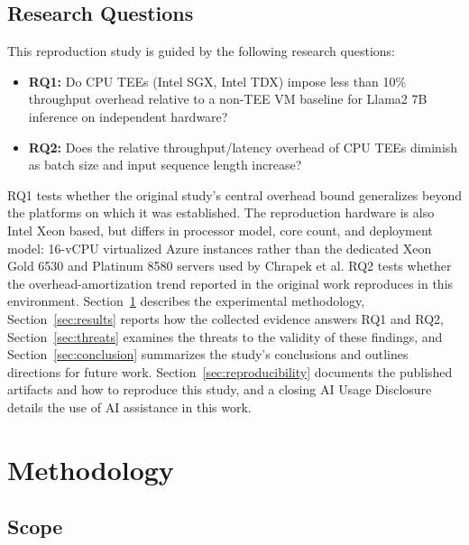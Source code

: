 \documentclass[sigconf]{acmart}
\begin{document}
\subsection{Research Questions}
\label{sec:rqs}

This reproduction study is guided by the following research questions:

\begin{itemize}
  \item \textbf{RQ1:} Do CPU TEEs (Intel SGX, Intel TDX) impose less than 10\%
  throughput overhead relative to a non-TEE VM baseline for Llama2 7B inference on
  independent hardware?
  \item \textbf{RQ2:} Does the relative throughput/latency overhead of CPU TEEs
  diminish as batch size and input sequence length increase?
\end{itemize}

RQ1 tests whether the original study's central overhead bound generalizes beyond the
platforms on which it was established. The reproduction hardware is also Intel Xeon
based, but differs in processor model, core count, and deployment model: 16-vCPU
virtualized Azure instances rather than the dedicated Xeon Gold 6530 and Platinum 8580
servers used by Chrapek et al. RQ2 tests whether the overhead-amortization trend
reported in the original work reproduces in this environment.
Section~\ref{sec:methodology} describes the experimental methodology,
Section~\ref{sec:results} reports how the collected evidence answers RQ1 and RQ2,
Section~\ref{sec:threats} examines the threats to the validity of these findings, and
Section~\ref{sec:conclusion} summarizes the study's conclusions and outlines directions
for future work. Section~\ref{sec:reproducibility} documents the published artifacts
and how to reproduce this study, and a closing AI Usage Disclosure details the use of
AI assistance in this work.

\section{Methodology}
\label{sec:methodology}

\subsection{Scope}
\label{sec:scope}
\end{document}

